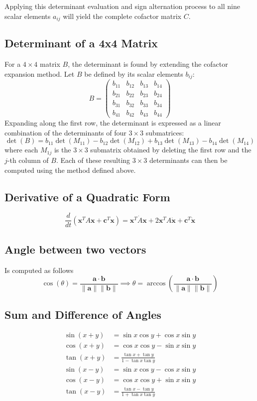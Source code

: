 \documentclass[10pt, a4paper]{report}
\begin{document}
Applying this determinant evaluation and sign alternation process to all nine scalar elements $a_{ij}$ will yield the complete cofactor matrix $C$.


\subsection*{Determinant of a 4x4 Matrix}
For a $4 \times 4$ matrix $B$, the determinant is found by extending the cofactor expansion method. Let $B$ be defined by its scalar elements $b_{ij}$:
$$
B = \begin{pmatrix}
    b_{11} & b_{12} & b_{13} & b_{14} \\
    b_{21} & b_{22} & b_{23} & b_{24} \\
    b_{31} & b_{32} & b_{33} & b_{34} \\
    b_{41} & b_{42} & b_{43} & b_{44}
\end{pmatrix}
$$
Expanding along the first row, the determinant is expressed as a linear combination of the determinants of four $3 \times 3$ submatrices:
$$
\det(B) = b_{11}\det(M_{11}) - b_{12}\det(M_{12}) + b_{13}\det(M_{13}) - b_{14}\det(M_{14})
$$
where each $M_{1j}$ is the $3 \times 3$ submatrix obtained by deleting the first row and the $j$-th column of $B$. Each of these resulting $3 \times 3$ determinants can then be computed using the method defined above.
\subsection*{Derivative of a Quadratic Form}
\begin{equation}
    \frac{d}{dt}(\mathbf x^TA\mathbf x+\mathbf c^T{\mathbf x})=\mathbf x^T\dot A \mathbf x+2\mathbf x^TA\dot{\mathbf x}+\mathbf c^T\dot{\mathbf x}
\end{equation}
\subsection*{Angle between two vectors}
Is computed as follows\begin{equation}
    \cos(\theta) = \frac{\mathbf{a} \cdot \mathbf{b}}{\|\mathbf{a}\| \|\mathbf{b}\|}\implies \theta = \arccos\left(\frac{\mathbf{a} \cdot \mathbf{b}}{\|\mathbf{a}\| \|\mathbf{b}\|}\right)
\end{equation}
\subsection*{Sum and Difference of Angles}
\begin{align}
\sin(x+y) &= \sin x\cos y + \cos x\sin y \\
\cos(x+y) &= \cos x\cos y - \sin x\sin y \\
\tan(x+y) &= \frac{\tan x + \tan y}{1 - \tan x\tan y} \\[6pt]
\sin(x-y) &= \sin x\cos y - \cos x\sin y \\
\cos(x-y) &= \cos x\cos y + \sin x\sin y \\
\tan(x-y) &= \frac{\tan x - \tan y}{1 + \tan x\tan y}
\end{align}
\end{document}
